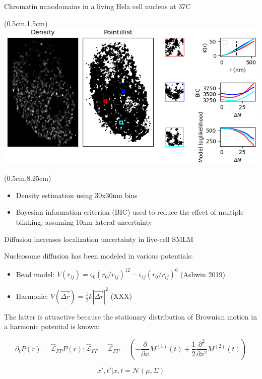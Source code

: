 \documentclass{beamer}					%
\begin{document}
\begin{frame}{Chromatin nanodomains in a living Hela cell nucleus at 37C}

\begin{textblock*}{13cm}(0.5cm,1.5cm)
\includegraphics[width=\textwidth]{Cluster.png}
\end{textblock*}

\begin{textblock*}{13cm}(0.5cm,8.25cm)
\begin{itemize}
\item Density estimation using 30x30nm bins
\item Bayesian information criterion (BIC) used to reduce the effect of multiple blinking, assuming 10nm lateral uncertainty
\end{itemize}
\end{textblock*}

\end{frame}

\begin{frame}{Diffusion increases localization uncertainty in live-cell SMLM}

Nucleosome diffusion has been modeled in various potentials:
\vspace{0.1in}
\begin{itemize}
\item Bead model: $V(r_{ij}) = \epsilon_{0}(r_{0}/r_{ij})^{12}-\epsilon_{ij}(r_{0}/r_{ij})^{6}$ (Ashwin 2019)
\item Harmonic: $V(\vec{\Delta r}) = \frac{1}{2}k|\vec{\Delta r}|^{2}$ (XXX)
\end{itemize}
\vspace{0.1in}
The latter is attractive because the stationary distribution of Brownian motion in a harmonic potential is known:


\begin{equation*}
\partial_{t}P(r) = \hat{\mathcal{L}}_{FP}P(r); \hat{\mathcal{L}}_{FP} = \hat{\mathcal{L}}_{FP} = \left(-\frac{\partial}{\partial x}M^{(1)}(t) + \frac{1}{2}\frac{\partial^{2}}{\partial x^{2}}M^{(2)}(t)\right)
\end{equation*}


\begin{equation*}
x',t'|x,t = \mathcal{N}(\mu,\Sigma)
\end{equation*}

\end{frame}
\end{document}
